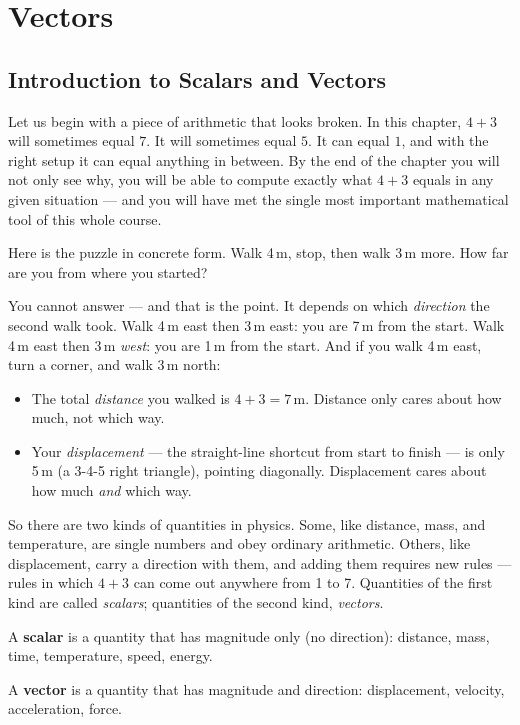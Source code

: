 \chapter{Vectors}

\section{Introduction to Scalars and Vectors}

Let us begin with a piece of arithmetic that looks broken. In this chapter,
$4+3$ will sometimes equal $7$. It will sometimes equal $5$. It can equal $1$,
and with the right setup it can equal anything in between. By the end of the
chapter you will not only see why, you will be able to compute exactly what
$4+3$ equals in any given situation --- and you will have met the single most
important mathematical tool of this whole course.

Here is the puzzle in concrete form. Walk 4\,m, stop, then walk 3\,m more. How
far are you from where you started?

You cannot answer --- and that is the point. It depends on which \emph{direction}
the second walk took. Walk 4\,m east then 3\,m east: you are 7\,m from the start.
Walk 4\,m east then 3\,m \emph{west}: you are 1\,m from the start. And if you walk
4\,m east, turn a corner, and walk 3\,m north:
\begin{itemize}
  \item The total \emph{distance} you walked is $4+3=7$\,m. Distance only cares about how much, not which way.
  \item Your \emph{displacement} --- the straight-line shortcut from start to finish --- is only 5\,m (a 3-4-5 right triangle), pointing diagonally. Displacement cares about how much \emph{and} which way.
\end{itemize}

So there are two kinds of quantities in physics. Some, like distance, mass,
and temperature, are single numbers and obey ordinary arithmetic. Others,
like displacement, carry a direction with them, and adding them requires new
rules --- rules in which $4+3$ can come out anywhere from 1 to 7. Quantities of
the first kind are called \emph{scalars}; quantities of the second kind,
\emph{vectors}.

\begin{keybox}
A \textbf{scalar} is a quantity that has magnitude only (no direction): distance, mass, time, temperature, speed, energy.

A \textbf{vector} is a quantity that has magnitude and direction: displacement, velocity, acceleration, force.
\end{keybox}

